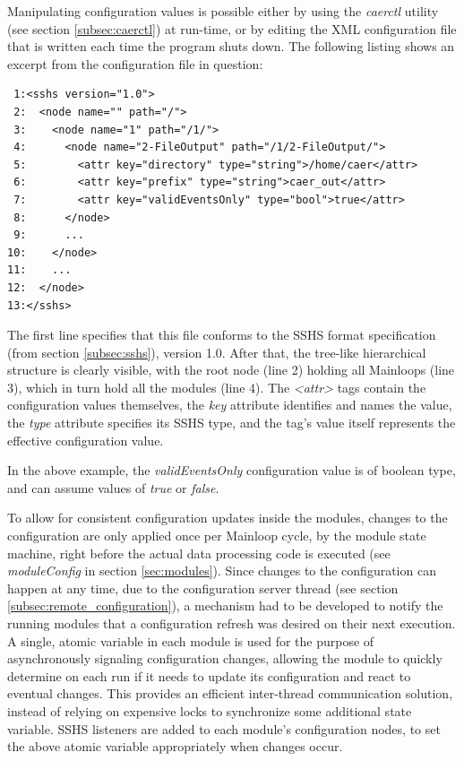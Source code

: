 \documentclass[a4paper,12pt]{report}
\begin{document}
Manipulating configuration values is possible either by using the \emph{caerctl} utility (see section \ref{subsec:caerctl}) at run-time, or by editing the XML configuration file that is written each time the program shuts down.
\clearpage
The following listing shows an excerpt from the configuration file in question:

\begin{lstlisting}
 1:<sshs version="1.0">
 2:  <node name="" path="/">
 3:    <node name="1" path="/1/">
 4:      <node name="2-FileOutput" path="/1/2-FileOutput/">
 5:        <attr key="directory" type="string">/home/caer</attr>
 6:        <attr key="prefix" type="string">caer_out</attr>
 7:        <attr key="validEventsOnly" type="bool">true</attr>
 8:      </node>
 9:      ...
10:    </node>
11:    ...
12:  </node>
13:</sshs>
\end{lstlisting}

The first line specifies that this file conforms to the SSHS format specification (from section \ref{subsec:sshs}), version 1.0.
After that, the tree-like hierarchical structure is clearly visible, with the root node (line 2) holding all Mainloops (line 3), which in turn hold all the modules (line 4).
The \emph{<attr>} tags contain the configuration values themselves, the \emph{key} attribute identifies and names the value, the \emph{type} attribute specifies its SSHS type, and the tag's value itself represents the effective configuration value.

In the above example, the \emph{validEventsOnly} configuration value is of boolean type, and can assume values of \emph{true} or \emph{false}.

To allow for consistent configuration updates inside the modules, changes to the configuration are only applied once per Mainloop cycle, by the module state machine, right before the actual data processing code is executed (see \emph{moduleConfig} in section \ref{sec:modules}).
Since changes to the configuration can happen at any time, due to the configuration server thread (see section \ref{subsec:remote_configuration}), a mechanism had to be developed to notify the running modules that a configuration refresh was desired on their next execution. A single, atomic variable in each module is used for the purpose of asynchronously signaling configuration changes, allowing the module to quickly determine on each run if it needs to update its configuration and react to eventual changes. This provides an efficient inter-thread communication solution, instead of relying on expensive locks to synchronize some additional state variable.
SSHS listeners are added to each module's configuration nodes, to set the above atomic variable appropriately when changes occur.
\end{document}
